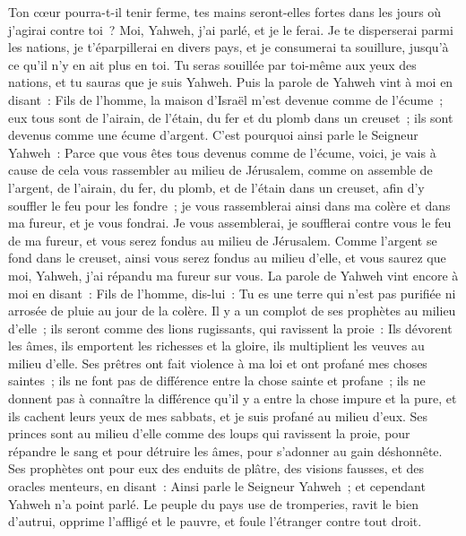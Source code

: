 \begin{multicols}{2}
Ton cœur pourra-t-il tenir ferme, tes mains seront-elles fortes dans les jours où j'agirai contre toi~? Moi, Yahweh, j'ai parlé, et je le ferai.
Je te disperserai parmi les nations, je t'éparpillerai en divers pays, et je consumerai ta souillure, jusqu'à ce qu'il n'y en ait plus en toi.
Tu seras souillée par toi-même aux yeux des nations, et tu sauras que je suis Yahweh.
Puis la parole de Yahweh vint à moi en disant~:
Fils de l'homme, la maison d'Israël m'est devenue comme de l'écume~; eux tous sont de l'airain, de l'étain, du fer et du plomb dans un creuset~; ils sont devenus comme une écume d'argent.
C'est pourquoi ainsi parle le Seigneur Yahweh~: Parce que vous êtes tous devenus comme de l'écume, voici, je vais à cause de cela vous rassembler au milieu de Jérusalem,
comme on assemble de l'argent, de l'airain, du fer, du plomb, et de l'étain dans un creuset, afin d'y souffler le feu pour les fondre~; je vous rassemblerai ainsi dans ma colère et dans ma fureur, et je vous fondrai.
Je vous assemblerai, je soufflerai contre vous le feu de ma fureur, et vous serez fondus au milieu de Jérusalem.
Comme l'argent se fond dans le creuset, ainsi vous serez fondus au milieu d'elle, et vous saurez que moi, Yahweh, j'ai répandu ma fureur sur vous.
La parole de Yahweh vint encore à moi en disant~:
Fils de l'homme, dis-lui~: Tu es une terre qui n'est pas purifiée ni arrosée de pluie au jour de la colère.
Il y a un complot de ses prophètes au milieu d'elle~; ils seront comme des lions rugissants, qui ravissent la proie~: Ils dévorent les âmes, ils emportent les richesses et la gloire, ils multiplient les veuves au milieu d'elle.
Ses prêtres ont fait violence à ma loi et ont profané mes choses saintes~; ils ne font pas de différence entre la chose sainte et profane~; ils ne donnent pas à connaître la différence qu'il y a entre la chose impure et la pure, et ils cachent leurs yeux de mes sabbats, et je suis profané au milieu d'eux.
Ses princes sont au milieu d'elle comme des loups qui ravissent la proie, pour répandre le sang et pour détruire les âmes, pour s'adonner au gain déshonnête.
Ses prophètes ont pour eux des enduits de plâtre, des visions fausses, et des oracles menteurs, en disant~: Ainsi parle le Seigneur Yahweh~; et cependant Yahweh n'a point parlé.
Le peuple du pays use de tromperies, ravit le bien d'autrui, opprime l'affligé et le pauvre, et foule l'étranger contre tout droit.

\end{multicols}
